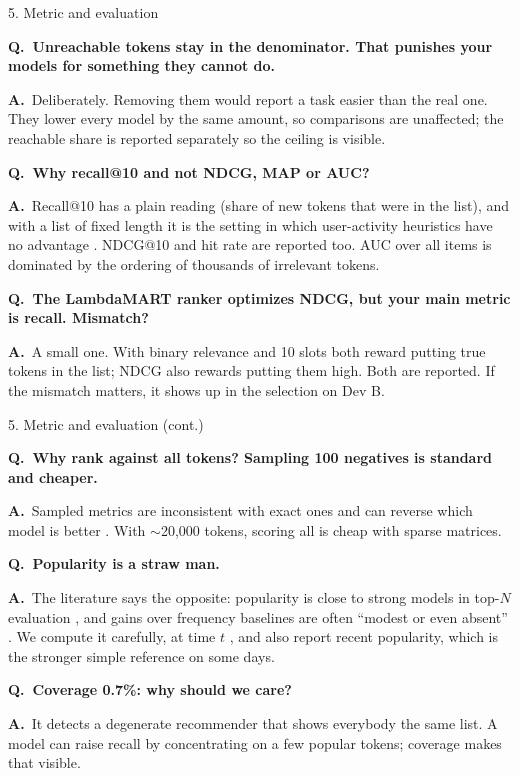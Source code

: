 \documentclass[aspectratio=169,10pt]{beamer}
\newcommand{\Q}[1]{\par{\color{orange}\bfseries Q.\ #1}\par\smallskip}
\newcommand{\A}{{\color{teal}\bfseries A.}\ }
\newcommand{\toindex}{\hfill\hyperlink{index}{\beamerreturnbutton{index}}}
\newcommand{\qsep}{\par\medskip{\color{grey!40}\hrule}\medskip}
\begin{document}
\begin{frame}[label=qeval]{5. Metric and evaluation \toindex}
  \footnotesize
  \Q{Unreachable tokens stay in the denominator. That punishes your models for something they cannot do.}
  \A Deliberately. Removing them would report a task easier than the real one. They lower every model by the same amount, so comparisons are unaffected; the reachable share is reported separately so the ceiling is visible.
  \qsep
  \Q{Why recall@10 and not NDCG, MAP or AUC?}
  \A Recall@10 has a plain reading (share of new tokens that were in the list), and with a list of fixed length it is the setting in which user-activity heuristics have no advantage \cite{schein2002}. NDCG@10 and hit rate are reported too. AUC over all items is dominated by the ordering of thousands of irrelevant tokens.
  \qsep
  \Q{The LambdaMART ranker optimizes NDCG, but your main metric is recall. Mismatch?}
  \A A small one. With binary relevance and 10 slots both reward putting true tokens in the list; NDCG also rewards putting them high. Both are reported. If the mismatch matters, it shows up in the selection on Dev B.
\end{frame}

\begin{frame}{5. Metric and evaluation (cont.) \toindex}
  \footnotesize
  \Q{Why rank against all tokens? Sampling 100 negatives is standard and cheaper.}
  \A Sampled metrics are inconsistent with exact ones and can reverse which model is better \cite{krichene2020}. With $\sim$20{,}000 tokens, scoring all is cheap with sparse matrices.
  \qsep
  \Q{Popularity is a straw man.}
  \A The literature says the opposite: popularity is close to strong models in top-$N$ evaluation \cite{cremonesi2010}, and gains over frequency baselines are often ``modest or even absent'' \cite{li2021}. We compute it carefully, at time $t$ \cite{ji2020pop}, and also report recent popularity, which is the stronger simple reference on some days.
  \qsep
  \Q{Coverage 0.7\%: why should we care?}
  \A It detects a degenerate recommender that shows everybody the same list. A model can raise recall by concentrating on a few popular tokens; coverage makes that visible.
\end{frame}
\end{document}
